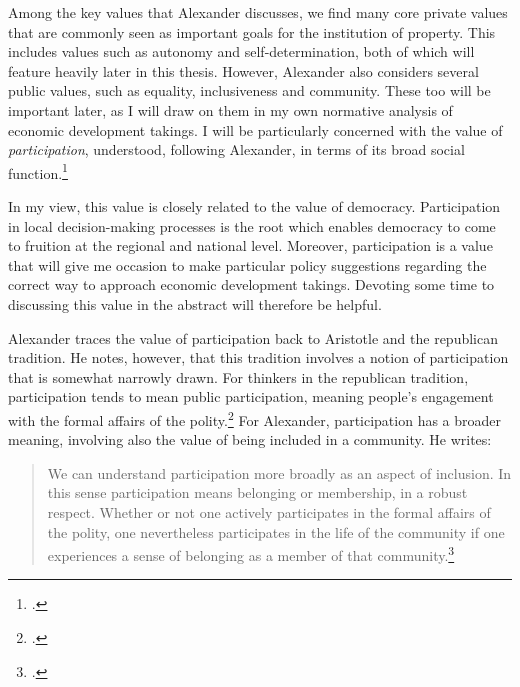Among the key values that Alexander discusses, we find many core private values that are commonly seen as important goals for the institution of property. This includes values such as autonomy and self-determination, both of which will feature heavily later in this thesis. However, Alexander also considers several public values, such as equality, inclusiveness and community. These too will be important later, as I will draw on them in my own normative analysis of economic development takings. I will be particularly concerned with the value of {\it participation}, understood, following Alexander, in terms of its broad social function.\footcite[1275-1276]{alexander14}

In my view, this value is closely related to the value of democracy. Participation in local decision-making processes is the root which enables democracy to come to fruition at the regional and national level. Moreover, participation is a value that will give me occasion to make particular policy suggestions regarding the correct way to approach economic development takings. Devoting some time to discussing this value in the abstract will therefore be helpful.

Alexander traces the value of participation back to Aristotle and the republican tradition. He notes, however, that this tradition involves a notion of participation that is somewhat narrowly drawn. For thinkers in the republican tradition, participation tends to mean public participation, meaning people's engagement with the formal affairs of the polity.\footcite[1275]{alexander14} For Alexander, participation has a broader meaning, involving also the value of being included in a community. He writes:

\begin{quote}
We can understand participation more broadly as an aspect of inclusion. In this sense participation means belonging or membership, in a robust respect. Whether or not one actively participates in the formal affairs of the polity, one nevertheless participates in the life of the community if one experiences a sense of belonging as a member of that community.\footcite[1275]{alexander14}
\end{quote}

